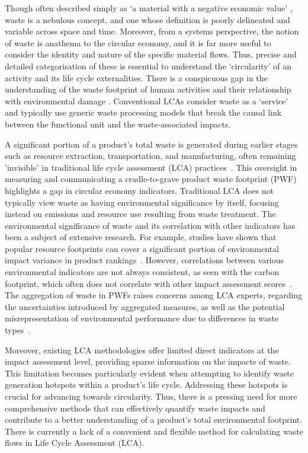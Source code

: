 Though often described simply as `a material with a negative economic value' \citep{guinee2004economicallocation}, waste is a nebulous concept, and one whose definition is poorly delineated and variable across space and time.  Moreover, from a systems perspective, the notion of waste is anathema to the circular economy, and it is far more useful to consider the identity and nature of the specific material flows. Thus, precise and detailed categorisation of these is essential to understand the `circularity' of an activity and its life cycle externalities. There is a conspicuous gap in the understanding of the waste footprint of human activities and their relationship with environmental damage \citep{laurenti2023wastefootprint}. Conventional LCAs consider waste as a `service' \citep{guinee2021wasteisnotaservice} and typically use generic waste processing models \citep{beylot2018} that break the causal link between the functional unit and the waste-associated impacts.

A significant portion of a product's total waste is generated during earlier stages such as resource extraction, transportation, and manufacturing, often remaining 'invisible' in traditional life cycle assessment (LCA) practices~\citep{laurenti2016wastefootprint}. This oversight in measuring and communicating a cradle-to-grave product waste footprint (PWF) highlights a gap in circular economy indicators. Traditional LCA does not typically view waste as having environmental significance by itself, focusing instead on emissions and resource use resulting from waste treatment. The environmental significance of waste and its correlation with other indicators has been a subject of extensive research. For example, studies have shown that popular resource footprints can cover a significant portion of environmental impact variance in product rankings~\citep{steinmann2017resourcefootprints}. However, correlations between various environmental indicators are not always consistent, as seen with the carbon footprint, which often does not correlate with other impact assessment scores~\citep{laurent2012carbonfootprint}. The aggregation of waste in PWFs raises concerns among LCA experts, regarding the uncertainties introduced by aggregated measures, as well as the potential misrepresentation of environmental performance due to differences in waste types~\citep{chen2021methoduncertainty,huijbregts2010energyfootprint}.

Moreover, existing LCA methodologies offer limited direct indicators at the impact assessment level, providing sparse information on the impacts of waste. This limitation becomes particularly evident when attempting to identify waste generation hotspots within a product's life cycle. Addressing these hotspots is crucial for advancing towards circularity. Thus, there is a pressing need for more comprehensive methods that can effectively quantify waste impacts and contribute to a better understanding of a product's total environmental footprint.
There is currently a lack of a convenient and flexible method for calculating waste flows in Life Cycle Assessment (LCA). 

